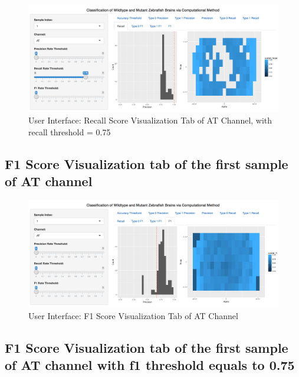 \documentclass[10pt,letterpaper]{article}
\begin{document}
\begin{figure}[h]

{\centering \includegraphics[width=4.91in]{figures/shiny5} 

}

\caption{User Interface: Recall Score Visualization Tab of AT Channel, with recall threshold = 0.75}\label{fig:shiny5}
\end{figure}

\newpage

\subsection{F1 Score Visualization tab of the first sample of AT
channel}\label{f1-score-visualization-tab-of-the-first-sample-of-at-channel}

\begin{figure}[h]

{\centering \includegraphics[width=4.9in]{figures/shiny6} 

}

\caption{User Interface: F1 Score Visualization Tab of AT Channel}\label{fig:shiny6}
\end{figure}

\subsection{F1 Score Visualization tab of the first sample of AT channel
with f1 threshold equals to
0.75}\label{f1-score-visualization-tab-of-the-first-sample-of-at-channel-with-f1-threshold-equals-to-0.75}
\end{document}
